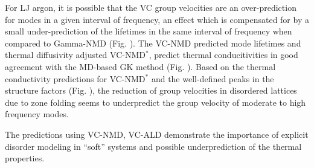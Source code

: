 \documentclass[aps,prb,twocolumn,superscriptaddress,amsmath,amssymb,floatfix]{revtex4}
\newcommand{\kv}{\mspace{-4.0mu}\left(\mspace{-8.0mu}
\begin{smallmatrix}&\pmb{\kappa} \\&\nu\end{smallmatrix}
\mspace{-3.0mu}\right)}
\begin{document}
For LJ argon, it is possible that the VC group velocities are an 
over-prediction for modes in a given interval of frequency, 
an effect which is compensated for 
by a small under-prediction of the lifetimes in the same interval of 
frequency when compared to Gamma-NMD (Fig. ). 
The VC-NMD predicted 
mode lifetimes and thermal diffusivity adjusted VC-NMD$^*$, 
predict thermal conducitivities in good agreement with 
the MD-based GK method (Fig. ). 
Based on the thermal conductivity predictions for VC-NMD$^*$ and 
the well-defined peaks in the structure factors 
(Fig. ), the reduction of group velocities in disordered lattices 
due to zone folding seems to underpredict the group velocity of 
moderate to high frequency modes.\cite{duda_reducing_2011}  

The predictions using 
VC-NMD, VC-ALD demonstrate the importance of explicit disorder 
modeling in ``soft'' systems and possible underprediction 
of the thermal properties.\cite{tian_phonon_2012}




\end{document}

